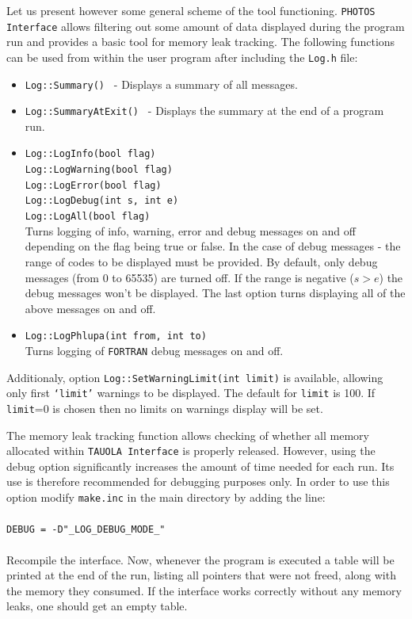 \documentclass[]{Photos_interface_design}
\begin{document}
Let us present however some general scheme of the tool functioning.
{\tt PHOTOS Interface} allows filtering out some amount of data displayed during the program run
and provides a basic tool for memory leak tracking. The following functions
can be used from within the user program after including the {\tt Log.h} file:
\begin{itemize}
  \item {\tt Log::Summary() } - Displays a summary of all messages.
  \item {\tt Log::SummaryAtExit() } - Displays the summary at the end of a program run.
  \item {\tt Log::LogInfo(bool flag) } \\
        {\tt Log::LogWarning(bool flag) } \\
        {\tt Log::LogError(bool flag) } \\
        {\tt Log::LogDebug(int s, int e) } \\
        {\tt Log::LogAll(bool flag)} \\
        Turns logging of info, warning, error and debug messages on and off depending
        on the flag being true or false. In the case of debug messages - the range of codes
        to be displayed must be provided. By default, only debug messages
        (from 0 to 65535) are turned off. If the range is negative ($s>e$) the debug messages
        won't be displayed. The last option turns displaying all of the above messages on and off.
  \item {\tt Log::LogPhlupa(int from, int to) } \\
        Turns logging of {\tt FORTRAN} debug messages on and off.
\end{itemize}

Additionaly, option {\tt Log::SetWarningLimit(int limit)} is available, allowing
only first {\tt `limit'} warnings to be displayed. The default for {\tt limit} is 100. 
If {\tt limit}=0 is chosen then no limits on warnings display will be set.

The memory leak tracking function allows checking of whether all memory allocated within {\tt TAUOLA Interface}
 is properly released. However, using the debug option significantly increases the amount of time needed for 
each run. Its  use is therefore recommended  for debugging purposes only. In order to use this option
 modify {\tt make.inc} in the main directory by adding the line: \\
\\ {\tt DEBUG = -D"\_LOG\_DEBUG\_MODE\_" } \\ \\
Recompile the interface.
Now, whenever the program is executed a table will be printed at the end of the run,
listing all pointers that were not freed, along with the memory they consumed.
If the interface works correctly without any memory leaks, one should get an empty table.
\end{document}
